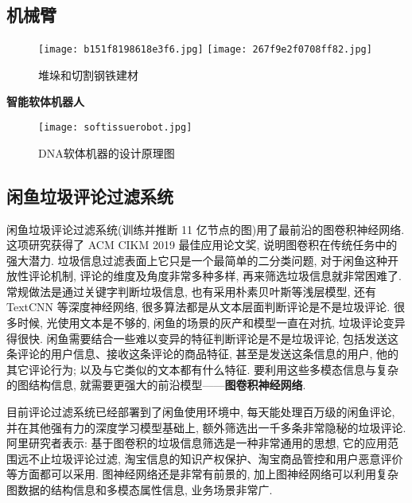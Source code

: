 \subsection{\textbf{机械臂}}

\begin{figure}[H]
	\centering
	\texttt{[image: b151f8198618e3f6.jpg]}
	\texttt{[image: 267f9e2f0708ff82.jpg]}
	\caption{堆垛和切割钢铁建材}
   \label{AI:7bf40ad1cb80Fig4}
\end{figure}
\textbf{智能软体机器人}
\begin{figure}[H]
\centering
\texttt{[image: softissuerobot.jpg]}
\caption{DNA软体机器的设计原理图}
\label{softissuerobot}
\end{figure}
\subsection{闲鱼垃圾评论过滤系统}
闲鱼垃圾评论过滤系统(训练并推断 11 亿节点的图)用了最前沿的图卷积神经网络. 这项研究获得了 ACM CIKM 2019 最佳应用论文奖, 说明图卷积在传统任务中的强大潜力.
垃圾信息过滤表面上它只是一个最简单的二分类问题, 对于闲鱼这种开放性评论机制, 评论的维度及角度非常多种多样, 再来筛选垃圾信息就非常困难了.
常规做法是通过关键字判断垃圾信息, 也有采用朴素贝叶斯等浅层模型, 还有 TextCNN 等深度神经网络, 很多算法都是从文本层面判断评论是不是垃圾评论.
很多时候, 光使用文本是不够的, 闲鱼的场景的灰产和模型一直在对抗, 垃圾评论变异得很快.
闲鱼需要结合一些难以变异的特征判断评论是不是垃圾评论, 包括发送这条评论的用户信息、接收这条评论的商品特征, 甚至是发送这条信息的用户, 他的其它评论行为; 以及与它类似的文本都有什么特征.
要利用这些多模态信息与复杂的图结构信息, 就需要更强大的前沿模型——\textbf{图卷积神经网络}.

目前评论过滤系统已经部署到了闲鱼使用环境中, 每天能处理百万级的闲鱼评论, 并在其他强有力的深度学习模型基础上, 额外筛选出一千多条非常隐秘的垃圾评论.
阿里研究者表示: 基于图卷积的垃圾信息筛选是一种非常通用的思想, 它的应用范围远不止垃圾评论过滤, 淘宝信息的知识产权保护、淘宝商品管控和用户恶意评价等方面都可以采用.
图神经网络还是非常有前景的, 加上图神经网络可以利用复杂图数据的结构信息和多模态属性信息, 业务场景非常广.

